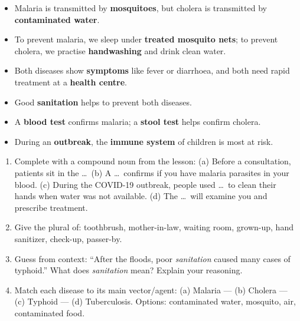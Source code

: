 \documentclass[11pt]{article}
\begin{document}
\begin{exemplebox}
\begin{itemize}
\item Malaria is transmitted by \textbf{mosquitoes}, but cholera is transmitted by \textbf{contaminated water}.
\item To prevent malaria, we sleep under \textbf{treated mosquito nets}; to prevent cholera, we practise \textbf{handwashing} and drink clean water.
\item Both diseases show \textbf{symptoms} like fever or diarrhoea, and both need rapid treatment at a \textbf{health centre}.
\item Good \textbf{sanitation} helps to prevent both diseases.
\item A \textbf{blood test} confirms malaria; a \textbf{stool test} helps confirm cholera.
\item During an \textbf{outbreak}, the \textbf{immune system} of children is most at risk.
\end{itemize}
\end{exemplebox}

\begin{exercice}
\begin{enumerate}
\item Complete with a compound noun from the lesson: (a) Before a consultation, patients sit in the \dots\ (b) A \dots\ confirms if you have malaria parasites in your blood. (c) During the COVID-19 outbreak, people used \dots\ to clean their hands when water was not available. (d) The \dots\ will examine you and prescribe treatment.
\item Give the plural of: toothbrush, mother-in-law, waiting room, grown-up, hand sanitizer, check-up, passer-by.
\item Guess from context: ``After the floods, poor \emph{sanitation} caused many cases of typhoid.'' What does \emph{sanitation} mean? Explain your reasoning.
\item Match each disease to its main vector/agent: (a) Malaria --- (b) Cholera --- (c) Typhoid --- (d) Tuberculosis. Options: contaminated water, mosquito, air, contaminated food.
\end{enumerate}
\end{exercice}
\end{document}
